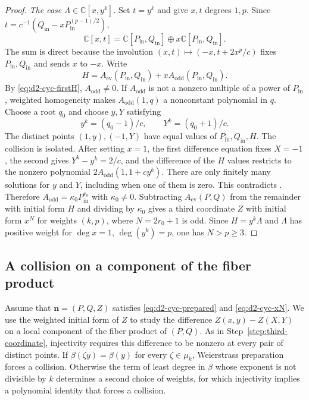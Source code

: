 \documentclass[11pt,letterpaper]{article}
\numberwithin{equation}{section}
\theoremstyle{remark}
\theoremstyle{plain}
\newcommand{\C}{\mathbb{C}}
\begin{document}
\begin{proof}
\smallskip
\noindent\emph{The case $\Lambda\in\C[x,y^k]$.}
Set $t=y^k$ and give $x,t$ degrees $1,p$.  Since
$t=c^{-1}(Q_{\mathrm{in}}-xP_{\mathrm{in}}^{(p-1)/2})$,
\[
 \C[x,t]=\C[P_{\mathrm{in}},Q_{\mathrm{in}}]
       \oplus x\C[P_{\mathrm{in}},Q_{\mathrm{in}}].
\]
The sum is direct because the involution
$(x,t)\mapsto(-x,t+2x^p/c)$ fixes $P_{\mathrm{in}},Q_{\mathrm{in}}$
and sends $x$ to $-x$.
Write
\[
 H=A_{\mathrm{ev}}(P_{\mathrm{in}},Q_{\mathrm{in}})
       +xA_{\mathrm{odd}}(P_{\mathrm{in}},Q_{\mathrm{in}}).
\]
By \eqref{eq:d2-cyc-firstH}, $A_{\mathrm{odd}}\neq0$.
If $A_{\mathrm{odd}}$ is not a nonzero multiple of a power of
$P_{\mathrm{in}}$, weighted homogeneity makes
$A_{\mathrm{odd}}(1,q)$ a nonconstant polynomial in $q$.
Choose a root $q_0$ and choose $y,Y$ satisfying
\[
 y^k=(q_0-1)/c,\qquad Y^k=(q_0+1)/c.
\]
The distinct points $(1,y),(-1,Y)$ have equal values of
$P_{\mathrm{in}},Q_{\mathrm{in}},H$.
The collision is isolated.  After setting $x=1$, the first
difference equation fixes $X=-1$, the second gives
$Y^k-y^k=2/c$, and the difference of the $H$ values restricts to
the nonzero polynomial
$2A_{\mathrm{odd}}(1,1+cy^k)$.
There are only finitely many solutions for $y$ and $Y$, including
when one of them is zero.  This contradicts
.
Therefore $A_{\mathrm{odd}}=\kappa_0P_{\mathrm{in}}^{r_0}$
with $\kappa_0\neq0$.
Subtracting $A_{\mathrm{ev}}(P,Q)$ from the remainder with initial form $H$
and dividing by $\kappa_0$ gives a third coordinate $Z$ with initial form $x^N$
for weights $(k,p)$, where $N=2r_0+1$ is odd.
Since $H=y^k\Lambda$ and $\Lambda$ has positive weight for
$\deg x=1$, $\deg(y^k)=p$, one has $N>p\geq3$.
\end{proof}

\subsection{A collision on a component of the fiber product}

Assume that $\boldsymbol n=(P,Q,Z)$ satisfies
\eqref{eq:d2-cyc-prepared} and \eqref{eq:d2-cyc-xN}.
We use the weighted initial form of $Z$ to study the difference
$Z(x,y)-Z(X,Y)$ on a local component of the fiber product of $(P,Q)$.
As in Step~\ref{step:third-coordinate}, injectivity requires this
difference to be nonzero at every pair of distinct points.
If $\beta(\zeta y)=\beta(y)$ for every $\zeta\in\mu_k$,
Weierstrass preparation forces a collision.  Otherwise the term of
least degree in $\beta$ whose exponent is not divisible by $k$
determines a second choice of weights,
for which injectivity implies a polynomial identity
that forces a collision.
\end{document}
